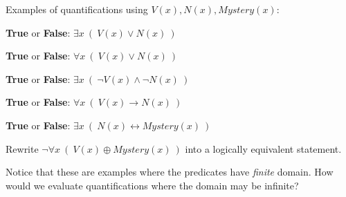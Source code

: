 
Examples of quantifications using $V(x), N(x), Mystery(x)$:



{\bf True} or {\bf False}: $\exists x~ (~V(x) \lor N(x)~)$

\vfill


{\bf True} or {\bf False}: $\forall x~ (~V(x) \lor N(x)~)$

\vfill


{\bf True} or {\bf False}: $\exists x~ (~\lnot V(x) \land \lnot N(x)~)$

\vfill

{\bf True} or {\bf False}: $\forall x~ (~V(x) \to N(x)~)$

\vfill

{\bf True} or {\bf False}: $\exists x~ (~N(x) \leftrightarrow Mystery(x)~)$

\vfill

Rewrite $\lnot \forall x~(~V(x) \oplus Mystery(x)~)$ into a logically equivalent statement.

\vspace{50pt}


Notice that these are examples where the predicates have {\it finite} domain.
How would we evaluate quantifications where the domain may be infinite?

\vfill

